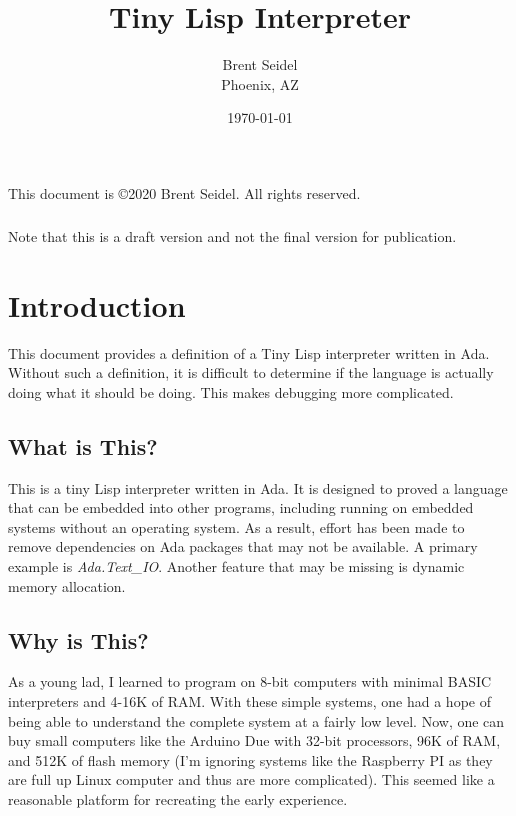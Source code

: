 \documentclass[10pt, openany]{book}
\title{Tiny Lisp Interpreter}
\author{Brent Seidel \\ Phoenix, AZ}
\date{ \today }
\begin{document}
%
%
\frontmatter
\maketitle
\begin{center}
This document is \copyright 2020 Brent Seidel.  All rights reserved.

\paragraph{}Note that this is a draft version and not the final version for publication.
\end{center}
\tableofcontents

\mainmatter

\chapter{Introduction}
This document provides a definition of a Tiny Lisp interpreter written in Ada.  Without such a definition, it is difficult to determine if the language is actually doing what it should be doing.  This makes debugging more complicated.

\section{What is This?}
This is a tiny Lisp interpreter written in Ada.  It is designed to proved a language that can be embedded into other programs, including running on embedded systems without an operating system.  As a result, effort has been made to remove dependencies on Ada packages that may not be available.  A primary example is \emph{Ada.Text\_IO}.  Another feature that may be missing is dynamic memory allocation.

\section{Why is This?}
As a young lad, I learned to program on 8-bit computers with minimal BASIC interpreters and 4-16K of RAM.  With these simple systems, one had a hope of being able to understand the complete system at a fairly low level.  Now, one can buy small computers like the Arduino Due with 32-bit processors, 96K of RAM, and 512K of flash memory (I'm ignoring systems like the Raspberry PI as they are full up Linux computer and thus are more complicated).  This seemed like a reasonable platform for recreating the early experience.
\end{document}
